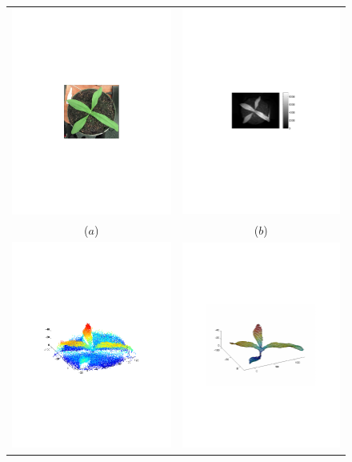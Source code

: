 \begin{figure}
\begin{center}
\begin{tabular}{ c c }
\includegraphics[trim=200 280 200 280,clip,width=0.4\linewidth]{Figures/plant1-rgb} &
\includegraphics[trim=220 270 160 280,clip,width=0.4\linewidth]{Figures/plant1-ir} \\
($a$) & ($b$) \\
\includegraphics[trim=180 270 180 280,clip,width=0.4\linewidth]{Figures/plant1-noise} &
\includegraphics[trim=180 270 180 280,clip,width=0.4\linewidth]{Figures/plant1-mesh} \\

\end{tabular}
\end{center}
\end{figure}
